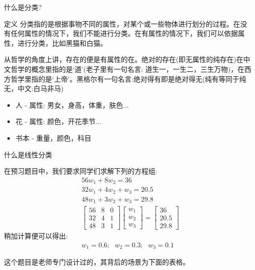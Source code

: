 \documentclass[handout]{ctexbeamer}
\begin{document}
\begin{frame}{什么是分类?}
	\begin{block}{定义}
	分类指的是根据事物不同的属性，对某个或一些物体进行划分的过程。在没有任何属性的情况下，我们不能进行分类。在有属性的情况下，我们可以依据属性，进行分类，比如黑猫和白猫。
\end{block}

从哲学的角度上讲，存在的便是有属性的在。绝对的存在(即无属性的纯存在)在中文哲学的概念里指的是`道’(老子里有一句名言: 道生一，一生二，三生万物)，在西方哲学里指的是`上帝'。黑格尔有一句名言:绝对得有即是绝对得无(纯有等同于纯无，中文:白马非马)
\begin{itemize}
	\item 人 - 属性: 男女，身高，体重，肤色...
	\item 花 - 属性: 颜色，开花季节...
	\item 书本 - 重量，颜色，科目
\end{itemize}
\end{frame}

\begin{frame}{什么是线性分类}
	\begin{example}
		在预习题目中，我们要求同学们求解下列的方程组:
	\begin{align*}
	& 56w_1 + 8 w_2 = 36 \\
	& 32 w_1+ 4 w_2 + w_3 = 20.5 \\
	& 48 w_1 + 3w_2 + w_3 = 29.8 \\
	& \begin{bmatrix}
		56 & 8 & 0 \\
		32 & 4 & 1 \\
		48 & 3 & 1 
	\end{bmatrix} \begin{bmatrix}
		w_1 \\
		w_2 \\
		w_3
	\end{bmatrix} = \begin{bmatrix}
		36 \\
		20.5 \\
		29.8 
	\end{bmatrix} 
\end{align*}
稍加计算便可以得出:
\begin{align*}
	w_1= 0.6; \ \ \ w_2 = 0.3; \ \ \ w_3 = 0.1 
\end{align*}
	\end{example}
	这个题目是老师专门设计过的，其背后的场景为下面的表格。
\end{frame}
\end{document}
